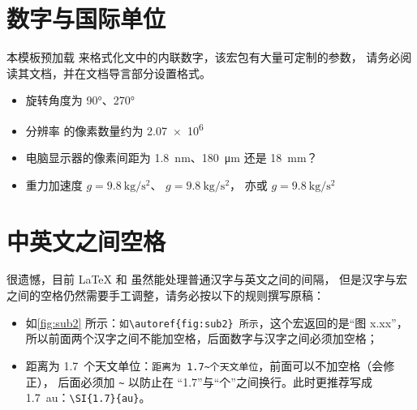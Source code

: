 \section{数字与国际单位}

本模板预加载  来格式化文中的内联数字，该宏包有大量可定制的参数，
请务必阅读其文档，并在文档导言部分设置格式。

\begin{itemize}
  \item 旋转角度为 \ang{90}、\ang{270}
  \item 分辨率  的像素数量约为 \num{2.07e6}
  \item 电脑显示器的像素间距为 \SI{1.8}{\nm}、\SI{180}{\um} 还是 \SI{18}{\mm}？
  \item 重力加速度 $g=\SI{9.8}{\kg\per\square\second}$、
  $g=\SI[inter-unit-product=\ensuremath{{}\cdot{}}]{9.8}{\kg\per\square\second}$，
  亦或 $g=\SI[per-mode=symbol]{9.8}{\kg\per\square\second}$
\end{itemize}

\section{中英文之间空格}

很遗憾，目前 \LaTeX{} 和 \CTeX{} 虽然能处理普通汉字与英文之间的间隔，
但是汉字与宏之间的空格仍然需要手工调整，请务必按以下的规则撰写原稿：
\begin{itemize}
  \item[\ding{51}] 如\autoref{fig:sub2} 所示：\verb|如\autoref{fig:sub2} 所示|，这个宏返回的是“图 x.xx”，
  所以前面两个汉字之间不能加空格，后面数字与汉字之间必须加空格；
  \item[\ding{51}] 距离为 1.7~个天文单位：\verb|距离为 1.7~个天文单位|，前面可以不加空格（\CTeX 会修正），
  后面必须加 \verb|~| 以防止在 “1.7”与“个”之间换行。此时更推荐写成 \SI{1.7}{au}：\verb|\SI{1.7}{au}|。
\end{itemize}
